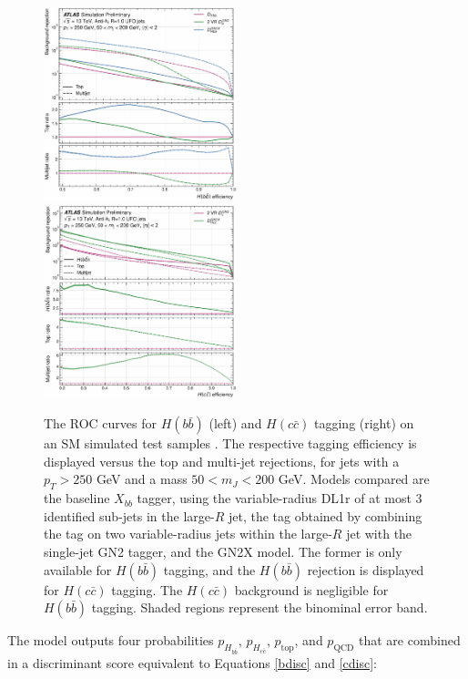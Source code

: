 \begin{center}
  \begin{figure}[h!]
  \centerline{
  \includegraphics[width=0.50\textwidth]{Images/FTAG/GN2X/roc/rocHbb.pdf}
  \includegraphics[width=0.50\textwidth]{Images/FTAG/GN2X/roc/rocHcc.pdf}
  }
  \caption{The ROC curves for $H(b\bar{b})$ (left) and $H(c\bar{c})$ tagging (right) on an SM simulated test samples \cite{ATL-PHYS-PUB-2023-021}. The respective tagging efficiency is displayed versus the top and multi-jet rejections, for jets with a $p_T > 250$ GeV and a mass $50 < m_J < 200$ GeV. Models compared are the baseline $X_{bb}$ tagger, using the variable-radius DL1r of at most 3 identified sub-jets in the large-$R$ jet, the tag obtained by combining the tag on two variable-radius jets within the large-$R$ jet with the single-jet GN2 tagger, and the GN2X model. The former is only available for $H(b\bar{b})$ tagging, and the $H(b\bar{b})$ rejection is displayed for $H(c\bar{c})$ tagging. The $H(c\bar{c})$ background is negligible for $H(b\bar{b})$ tagging. Shaded regions represent the binominal error band.}
  \label{fig:rocGN2X}
  \end{figure}
\end{center}
The model outputs four probabilities $p_{H_{b\bar{b}}}$, $p_{H_{c\bar{c}}}$, $p_{\textrm{top}}$, and $p_{\textrm{QCD}}$ that are combined in a discriminant score equivalent to Equations \ref{bdisc} and \ref{cdisc}: 
